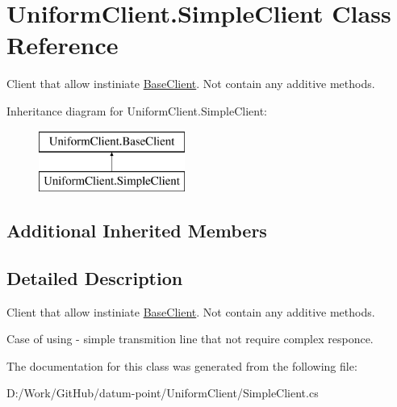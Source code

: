 \hypertarget{class_uniform_client_1_1_simple_client}{}\section{Uniform\+Client.\+Simple\+Client Class Reference}
\label{class_uniform_client_1_1_simple_client}


Client that allow instiniate \mbox{\hyperlink{class_uniform_client_1_1_base_client}{Base\+Client}}. Not contain any additive methods.  


Inheritance diagram for Uniform\+Client.\+Simple\+Client\+:\begin{figure}[H]
\begin{center}
\leavevmode
\includegraphics[height=2.000000cm]{d4/d3e/class_uniform_client_1_1_simple_client}
\end{center}
\end{figure}
\subsection*{Additional Inherited Members}


\subsection{Detailed Description}
Client that allow instiniate \mbox{\hyperlink{class_uniform_client_1_1_base_client}{Base\+Client}}. Not contain any additive methods. 

Case of using -\/ simple transmition line that not require complex responce. 

The documentation for this class was generated from the following file\+:\begin{DoxyCompactItemize}
\item 
D\+:/\+Work/\+Git\+Hub/datum-\/point/\+Uniform\+Client/Simple\+Client.\+cs\end{DoxyCompactItemize}
